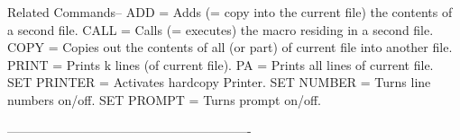 Related Commands--
          ADD             = Adds (= copy into the current file)
                            the contents of a second file.
          CALL            = Calls (= executes) the macro
                            residing in a second file.
          COPY            = Copies out the contents of all (or part)
                            of current file into another file.
          PRINT           = Prints k lines (of current file).
          PA              = Prints all lines of current file.
          SET PRINTER     = Activates hardcopy Printer.
          SET NUMBER      = Turns line numbers on/off.
          SET PROMPT      = Turns prompt on/off.
 
----------------------------------------------------------
 
 
 
 
 
 
 
 
 
 
 
 
 
 
 
 
 
 
 
 
 
 
 
 
 
 
 
 
 
 
 
 
 
 
 
 
 
 
 
 
 
 
 
 
 
 
 
 
 
 
 
 
 
 
 
 
 
 
 
 
 
 
 
 
 
 
 
 
 
 
 
 
 
 
 
 
 
 
 
 
 
 
 

